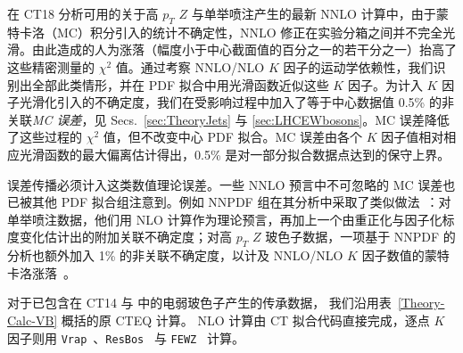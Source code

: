 在 CT18 分析可用的关于高 $p_T$ $Z$ 与单举喷注产生的最新 NNLO 计算中，由于蒙特卡洛（MC）积分引入的统计不确定性，NNLO 修正在实验分箱之间并不完全光滑。由此造成的人为涨落（幅度小于中心截面值的百分之一的若干分之一）抬高了这些精密测量的 $\chi^2$ 值。通过考察 NNLO/NLO $K$ 因子的运动学依赖性，我们识别出全部此类情形，并在 PDF 拟合中用光滑函数近似这些 $K$ 因子。为计入 $K$ 因子光滑化引入的不确定度，我们在受影响过程中加入了等于中心数据值 0.5\% 的非关联{\it MC 误差}，见 Secs.~\ref{sec:TheoryJets} 与 \ref{sec:LHCEWbosons}。MC 误差降低了这些过程的 $\chi^2$ 值，但不改变中心 PDF 拟合。MC 误差由各个 $K$ 因子值相对相应光滑函数的最大偏离估计得出，0.5\% 是对一部分拟合数据点达到的保守上界。

误差传播必须计入这类数值理论误差。一些 NNLO 预言中不可忽略的 MC 误差也已被其他 PDF 拟合组注意到。例如 NNPDF 组在其分析中采取了类似做法~\cite{Ball:2017nwa}：对单举喷注数据，他们用 NLO 计算作为理论预言，再加上一个由重正化与因子化标度变化估计出的附加关联不确定度；对高 $p_T$ $Z$ 玻色子数据，一项基于 NNPDF 的分析也额外加入 1\% 的非关联不确定度，以计及 NNLO/NLO $K$ 因子数值的蒙特卡洛涨落~\cite{Boughezal:2016wmq}。

对于已包含在 CT14 与 \CTHERAII{} 中的电弱玻色子产生的传承数据，
我们沿用表~\ref{Theory-Calc-VB} 概括的原 CTEQ 计算。
NLO 计算由 CT 拟合代码直接完成，逐点 $K$ 因子则用
\texttt{Vrap}~\cite{Anastasiou:2003ds,Anastasiou:2003yy}、\texttt{ResBos}~\cite{Ladinsky:1993zn,Konychev:2005iy} 与
\texttt{FEWZ}~\cite{Gavin:2010az,Gavin:2012sy,Li:2012wna} 计算。

